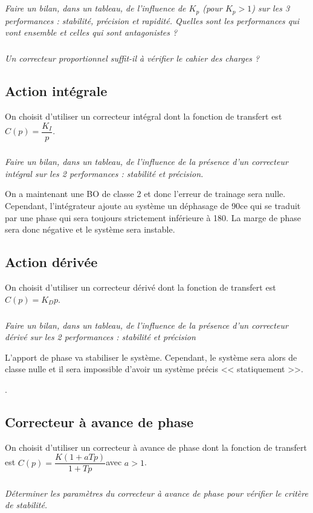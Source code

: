 \documentclass[10pt,fleqn]{article} %
\begin{document}
\begin{multicols}{2}
\subparagraph{}
\textit{Faire un bilan, dans un tableau, de l’influence de $K_p$ (pour $K_p>1$) sur les 3 performances : stabilité, précision et rapidité. Quelles sont les performances qui vont ensemble et celles qui sont antagonistes ?}
\ifprof
\begin{corrige}
\end{corrige}
\else
\fi

\subparagraph{}
\textit{Un correcteur proportionnel suffit-il à vérifier le cahier des charges ?}
\ifprof
\begin{corrige}
\end{corrige}
\else
\fi

\subsection*{Action intégrale}
On choisit d’utiliser un correcteur intégral dont la fonction de transfert est  $C(p)=\dfrac{K_I}{p}$.
\subparagraph{}
\textit{Faire un bilan, dans un tableau, de l’influence de la présence d’un correcteur intégral sur les 2 performances : stabilité et précision.}
\ifprof
\begin{corrige}
On a maintenant une BO de classe 2 et donc l'erreur de trainage sera nulle. Cependant, l'intégrateur ajoute au système un déphasage de 90\degres ce qui se traduit par une phase qui sera toujours strictement inférieure à 180\degres. La marge de phase sera donc négative et le système sera instable. 
\end{corrige}
\else
\fi

\subsection*{Action dérivée}
On choisit d’utiliser un correcteur dérivé dont la fonction de transfert est  $C(p)=K_Dp$.
\subparagraph{}
\textit{Faire un bilan, dans un tableau, de l’influence de la présence d’un correcteur dérivé sur les 2 performances : stabilité et précision}
\ifprof
\begin{corrige}
L'apport de phase va stabiliser le système. Cependant, le système sera alors de classe nulle et il sera impossible d'avoir un système précis << statiquement >>.
\end{corrige}
\else
\fi.

\subsection*{Correcteur à avance de phase}
On choisit d’utiliser un correcteur à avance de phase dont la fonction de transfert est 
$C(p)=\dfrac{K (1+aTp)}{1+Tp}$avec $a>1$.
\subparagraph{}
\textit{Déterminer les paramètres du correcteur à avance de phase pour vérifier le critère de stabilité.}
\ifprof
\begin{corrige}
\end{corrige}
\else
\fi


\end{multicols}
\end{document}
